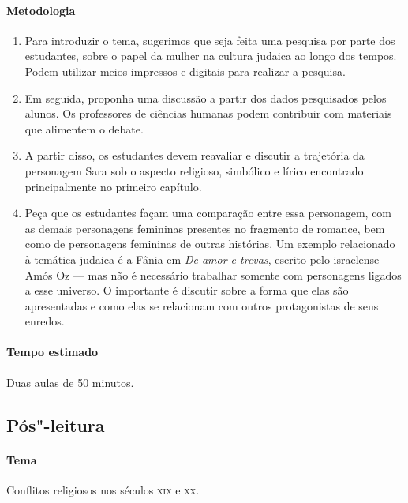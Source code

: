 \documentclass[12pt]{extarticle}
\begin{document}
\paragraph{Metodologia}

\begin{enumerate}

\item Para introduzir o tema, sugerimos que seja feita uma 
pesquisa por parte dos estudantes, sobre o papel da mulher
na cultura judaica ao longo dos tempos. Podem utilizar 
meios impressos e digitais para realizar a pesquisa.

\item Em seguida, proponha uma discussão a partir dos dados
pesquisados pelos alunos. Os professores de ciências
humanas podem contribuir com materiais que alimentem o debate. 

\item A partir disso, os estudantes devem reavaliar e discutir a
trajetória da personagem Sara sob o
aspecto religioso, simbólico e lírico encontrado principalmente no
primeiro capítulo.

\item Peça que os estudantes façam uma comparação entre essa personagem, com as
demais personagens femininas presentes no fragmento de romance, bem como
de  personagens femininas de outras histórias. Um exemplo relacionado à temática judaica é 
a Fânia em \emph{De amor e trevas}, escrito pelo israelense Amós Oz --- mas não 
é necessário trabalhar somente com personagens ligados a esse universo. O importante é 
discutir sobre a forma que elas são apresentadas e como elas se relacionam com outros 
protagonistas de seus enredos.

\end{enumerate}

\paragraph{Tempo estimado} Duas aulas de 50 minutos.
   

\subsection{Pós"-leitura}

\paragraph{Tema} Conflitos religiosos nos séculos \textsc{xix} e \textsc{xx}.
\end{document}
